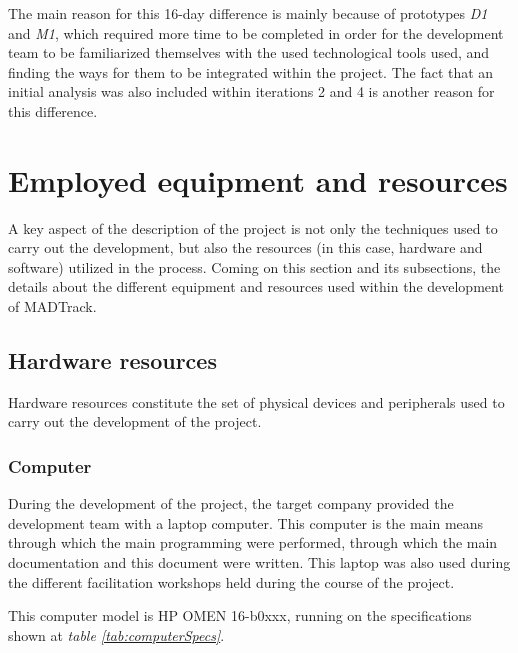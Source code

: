 The main reason for this 16-day difference is mainly because of prototypes \emph{D1} and \emph{M1}, which required more time to be completed in order for the development
team to be familiarized themselves with the used technological tools used, and finding the ways for them to be integrated within the project. The fact that an initial analysis was also 
included within iterations 2 and 4 is another reason for this difference.

\section{Employed equipment and resources}

A key aspect of the description of the project is not only the techniques used to carry out the development, but also the resources (in this case, hardware and software)
utilized in the process. Coming on this section and its subsections, the details about the different equipment and resources used within the development of MADTrack.

\subsection{Hardware resources}

Hardware resources constitute the set of physical devices and peripherals used to carry out the development of the project.

\subsubsection{Computer}

During the development of the project, the target company provided the development team with a laptop computer. This computer is the main means through which the main programming
were performed, through which the main documentation and this document were written. This laptop was also used during the different facilitation workshops held during the course
of the project.

This computer model is HP OMEN 16-b0xxx, running on the specifications shown at \emph{table \ref{tab:computerSpecs}}.

